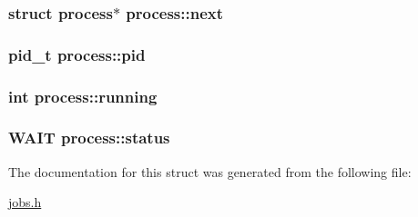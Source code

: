 \subsubsection[{\texorpdfstring{next}{next}}]{\setlength{\rightskip}{0pt plus 5cm}struct {\bf process}$\ast$ process\+::next}\hypertarget{structprocess_aa714b70ab9ca99fc489de2f70a091b0b}{}\label{structprocess_aa714b70ab9ca99fc489de2f70a091b0b}
\subsubsection[{\texorpdfstring{pid}{pid}}]{\setlength{\rightskip}{0pt plus 5cm}pid\+\_\+t process\+::pid}\hypertarget{structprocess_ab7b330a89c9b52c5f0c7dedd4f90dfb8}{}\label{structprocess_ab7b330a89c9b52c5f0c7dedd4f90dfb8}
\subsubsection[{\texorpdfstring{running}{running}}]{\setlength{\rightskip}{0pt plus 5cm}int process\+::running}\hypertarget{structprocess_ada5ec5eaed30b9d88d1cf6f2b27c3470}{}\label{structprocess_ada5ec5eaed30b9d88d1cf6f2b27c3470}
\subsubsection[{\texorpdfstring{status}{status}}]{\setlength{\rightskip}{0pt plus 5cm}W\+A\+IT process\+::status}\hypertarget{structprocess_ab1cc113f2cf7e94945d01e4366ac1d0c}{}\label{structprocess_ab1cc113f2cf7e94945d01e4366ac1d0c}


The documentation for this struct was generated from the following file\+:\begin{DoxyCompactItemize}
\item 
\hyperlink{jobs_8h}{jobs.\+h}\end{DoxyCompactItemize}
